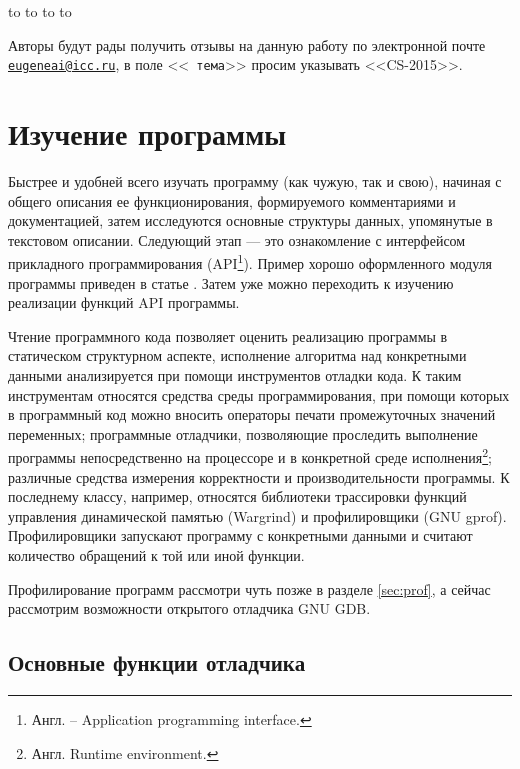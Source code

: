 \documentclass[14pt, a4paper, openany, twoside, final]{extbook} %
\begin{document}
\medskip
\noindent\hbox to \linewidth{\hfill\sf Старший~научный сотрудник ИДСТУ СО РАН,}
\noindent\hbox to \linewidth{\hfill\sf доцент кафедры ИТ ИМЭИ ИГУ}
\noindent\hbox to \linewidth{\hfill\sf кандидат~технических~наук}
\noindent\hbox to \linewidth{\hfill\sf Е.~А.~Черкашин}

\vfill
\makeatletter
{} Авторы будут рады получить отзывы на данную
работу по электронной почте
\href{mailto:eugeneai@icc.ru}{\tt{}eugeneai@icc.ru}, в поле <<{\tt
  тема}>> просим указывать <<CS-2015>>.
\makeatother

\chapter{Изучение программы}

Быстрее и удобней всего изучать программу (как чужую, так и свою), начиная с общего описания ее функционирования, формируемого комментариями и документацией, затем исследуются основные структуры данных, упомянутые в текстовом описании.  Следующий этап --- это ознакомление с интерфейсом прикладного программирования (API\footnote{Англ. -- Application programming interface.}).  Пример хорошо оформленного модуля программы приведен в статье \cite{fogel2009}.  Затем уже можно переходить к изучению реализации функций API программы.

Чтение программного кода позволяет оценить реализацию программы в статическом структурном аспекте, исполнение алгоритма над конкретными данными анализируется при помощи инструментов отладки кода.  К таким инструментам относятся средства среды программирования, при помощи которых в программный код можно вносить операторы печати промежуточных значений переменных; программные отладчики, позволяющие проследить выполнение программы непосредственно на процессоре и в конкретной среде исполнения\footnote{Англ. Runtime environment.}; различные средства измерения корректности и производительности программы.  К последнему классу, например, относятся библиотеки трассировки функций управления динамической памятью (Wargrind) и профилировщики (GNU gprof).  Профилировщики запускают программу с конкретными данными и считают количество обращений к той или иной функции.

Профилирование программ рассмотри чуть позже в разделе \ref{sec:prof},
а сейчас рассмотрим возможности открытого отладчика GNU GDB.

\section{Основные функции отладчика}
\end{document}
